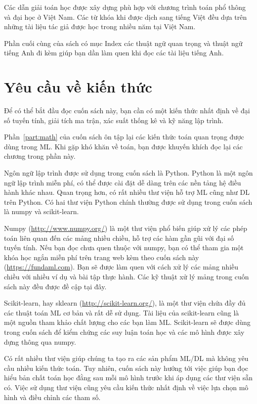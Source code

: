 Các dẫn giải toán học được xây dựng phù hợp với chương trình toán phổ thông và
đại học ở Việt Nam. Các từ khóa khi được dịch sang tiếng Việt đều dựa trên những
tài liệu tác giả được học trong nhiều năm tại Việt Nam.

Phần cuối cùng của sách có mục Index các thuật ngữ quan trọng và thuật ngữ tiếng Anh đi kèm giúp bạn dần làm quen khi đọc các tài liệu tiếng Anh.


\section{Yêu cầu về kiến thức}

Để có thể bắt đầu đọc cuốn sách này, bạn cần có một kiến thức nhất định về đại
số tuyến tính, giải tích ma trận, xác suất thống kê và kỹ năng lập trình.

Phần~\ref{part:math} của cuốn sách ôn tập lại các kiến thức toán quan trọng được
dùng trong ML. Khi gặp khó khăn về toán, bạn được khuyến khích đọc lại các
chương trong phần này.

Ngôn ngữ lập trình được sử dụng trong cuốn sách là Python. Python là một ngôn
ngữ lập trình miễn phí, có thể được cài đặt dễ dàng trên các nền tảng hệ điều
hành khác nhau. Quan trọng hơn, có rất nhiều thư viện hỗ trợ ML cũng như DL
trên Python. Có hai thư viện Python chính thường được sử dụng trong
cuốn sách là numpy và scikit-learn.

Numpy (\url{http://www.numpy.org/}) là một thư viện phổ biến giúp xử lý các phép
toán liên quan đến các mảng nhiều chiều, hỗ trợ các hàm gần gũi với đại số tuyến
tính. Nếu bạn đọc chưa quen thuộc với numpy, bạn có thể tham gia một khóa học
ngắn miễn phí trên trang web kèm theo cuốn sách này (\url{https://fundaml.com}).
Bạn sẽ được làm quen với cách xử lý các mảng nhiều chiều với nhiều ví dụ và bài
tập thực hành. Các kỹ thuật xử lý mảng trong cuốn sách này đều được đề cập tại
đây.

Scikit-learn, hay sklearn (\url{http://scikit-learn.org/}), là một thư viện chứa
đầy đủ các thuật toán ML cơ bản và rất dễ sử dụng. Tài liệu của scikit-learn
cũng là một nguồn tham khảo chất lượng cho các bạn làm ML. Scikit-learn sẽ được
dùng trong cuốn sách để kiểm chứng các suy luận toán học và các mô hình được xây
dựng thông qua numpy.

Có rất nhiều thư viện giúp chúng ta tạo ra các sản phẩm ML/DL mà không yêu
cầu nhiều kiến thức toán. Tuy nhiên, cuốn sách này hướng tới việc giúp bạn đọc
hiểu bản chất toán học đằng sau mỗi mô hình trước khi áp dụng các thư viện sẵn
có. Việc sử dụng thư viện cũng yêu cầu kiến thức nhất định về việc lựa chọn mô
hình và điều chỉnh các tham số.
